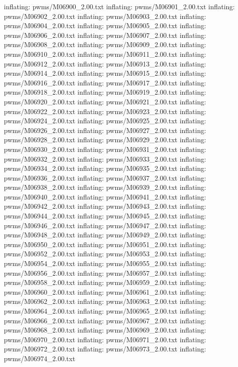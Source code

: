 \documentclass[letterpaper,10pt,english]{sphinxmanual}
\begin{document}
{\begin{sphinxVerbatim}[commandchars=\\\{\}]
  inflating: pwms/M06900\_2.00.txt
  inflating: pwms/M06901\_2.00.txt
  inflating: pwms/M06902\_2.00.txt
  inflating: pwms/M06903\_2.00.txt
  inflating: pwms/M06904\_2.00.txt
  inflating: pwms/M06905\_2.00.txt
  inflating: pwms/M06906\_2.00.txt
  inflating: pwms/M06907\_2.00.txt
  inflating: pwms/M06908\_2.00.txt
  inflating: pwms/M06909\_2.00.txt
  inflating: pwms/M06910\_2.00.txt
  inflating: pwms/M06911\_2.00.txt
  inflating: pwms/M06912\_2.00.txt
  inflating: pwms/M06913\_2.00.txt
  inflating: pwms/M06914\_2.00.txt
  inflating: pwms/M06915\_2.00.txt
  inflating: pwms/M06916\_2.00.txt
  inflating: pwms/M06917\_2.00.txt
  inflating: pwms/M06918\_2.00.txt
  inflating: pwms/M06919\_2.00.txt
  inflating: pwms/M06920\_2.00.txt
  inflating: pwms/M06921\_2.00.txt
  inflating: pwms/M06922\_2.00.txt
  inflating: pwms/M06923\_2.00.txt
  inflating: pwms/M06924\_2.00.txt
  inflating: pwms/M06925\_2.00.txt
  inflating: pwms/M06926\_2.00.txt
  inflating: pwms/M06927\_2.00.txt
  inflating: pwms/M06928\_2.00.txt
  inflating: pwms/M06929\_2.00.txt
  inflating: pwms/M06930\_2.00.txt
  inflating: pwms/M06931\_2.00.txt
  inflating: pwms/M06932\_2.00.txt
  inflating: pwms/M06933\_2.00.txt
  inflating: pwms/M06934\_2.00.txt
  inflating: pwms/M06935\_2.00.txt
  inflating: pwms/M06936\_2.00.txt
  inflating: pwms/M06937\_2.00.txt
  inflating: pwms/M06938\_2.00.txt
  inflating: pwms/M06939\_2.00.txt
  inflating: pwms/M06940\_2.00.txt
  inflating: pwms/M06941\_2.00.txt
  inflating: pwms/M06942\_2.00.txt
  inflating: pwms/M06943\_2.00.txt
  inflating: pwms/M06944\_2.00.txt
  inflating: pwms/M06945\_2.00.txt
  inflating: pwms/M06946\_2.00.txt
  inflating: pwms/M06947\_2.00.txt
  inflating: pwms/M06948\_2.00.txt
  inflating: pwms/M06949\_2.00.txt
  inflating: pwms/M06950\_2.00.txt
  inflating: pwms/M06951\_2.00.txt
  inflating: pwms/M06952\_2.00.txt
  inflating: pwms/M06953\_2.00.txt
  inflating: pwms/M06954\_2.00.txt
  inflating: pwms/M06955\_2.00.txt
  inflating: pwms/M06956\_2.00.txt
  inflating: pwms/M06957\_2.00.txt
  inflating: pwms/M06958\_2.00.txt
  inflating: pwms/M06959\_2.00.txt
  inflating: pwms/M06960\_2.00.txt
  inflating: pwms/M06961\_2.00.txt
  inflating: pwms/M06962\_2.00.txt
  inflating: pwms/M06963\_2.00.txt
  inflating: pwms/M06964\_2.00.txt
  inflating: pwms/M06965\_2.00.txt
  inflating: pwms/M06966\_2.00.txt
  inflating: pwms/M06967\_2.00.txt
  inflating: pwms/M06968\_2.00.txt
  inflating: pwms/M06969\_2.00.txt
  inflating: pwms/M06970\_2.00.txt
  inflating: pwms/M06971\_2.00.txt
  inflating: pwms/M06972\_2.00.txt
  inflating: pwms/M06973\_2.00.txt
  inflating: pwms/M06974\_2.00.txt

\end{sphinxVerbatim}}
\end{document}
